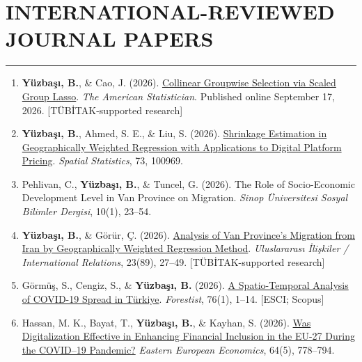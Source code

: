 \documentclass[10pt,letterpaper]{article}
\newcommand{\NewPart}[2]{%
	\Needspace{7\baselineskip}%
	\vspace{0.45em}%
	\section*{\sffamily\large\bfseries\color{MidnightBlue}\uppercase{#1} #2}%
	\vspace{-0.7em}\noindent\color{MidnightBlue}\rule{\textwidth}{0.55pt}\color{Black}\vspace{0.25em}}
\newenvironment{etaremune}{\begin{enumerate}}{\end{enumerate}}
\newcommand{\JournalInfo}[2]{\hspace{0.3em}{\small\textsf{[#1; #2]}}}
\newcommand{\TubitakOutput}{{\small\textsf{[T\"{U}B\.{I}TAK-supported research]}}}
\begin{document}

\NewPart{International-Reviewed Journal Papers}{}


\begin{etaremune}
\renewcommand{\theenumi}{A\arabic{enumi}}

\item {\bf Y\"{u}zba\c{s}{\i}, B.}, \& Cao, J. (2026). \href{https://doi.org/10.1080/00031305.2026.2709494}{Collinear Groupwise Selection via Scaled Group Lasso}. \textit{The American Statistician}. Published online September 17, 2026. \JournalInfo{SCIE}{Q1} \TubitakOutput

\item {\bf Y\"{u}zba\c{s}{\i}, B.}, Ahmed, S. E., \& Liu, S. (2026). \href{https://doi.org/10.1016/j.spasta.2026.100969}{Shrinkage Estimation in Geographically Weighted Regression with Applications to Digital Platform Pricing}. \textit{Spatial Statistics}, 73, 100969. \JournalInfo{SCIE}{Q1}

\item Pehlivan, C., {\bf Y\"{u}zba\c{s}{\i}, B.}, \& Tuncel, G. (2026). The Role of Socio-Economic Development Level in Van Province on Migration. \textit{Sinop \"{U}niversitesi Sosyal Bilimler Dergisi}, 10(1), 23--54.

\item {\bf Y\"{u}zba\c{s}{\i}, B.}, \& G\"{o}r\"{u}r, \c{C}. (2026). \href{https://doi.org/10.33458/uidergisi.1853672}{Analysis of Van Province's Migration from Iran by Geographically Weighted Regression Method}. \textit{Uluslararas{\i} \.{I}li\c{s}kiler / International Relations}, 23(89), 27--49. \JournalInfo{SSCI}{Q3} \TubitakOutput

\item G\"{o}rm\"{u}\c{s}, S., Cengiz, S., \& {\bf Y\"{u}zba\c{s}{\i}, B.} (2026). \href{https://forestist.org/index.php/pub/article/view/2688}{A Spatio-Temporal Analysis of COVID-19 Spread in T\"{u}rkiye}. \textit{Forestist}, 76(1), 1--14. {\small\textsf{[ESCI; Scopus]}}

\item Hassan, M. K., Bayat, T., {\bf Y\"{u}zba\c{s}{\i}, B.}, \& Kayhan, S. (2026). \href{https://doi.org/10.1080/00128775.2025.2546468}{Was Digitalization Effective in Enhancing Financial Inclusion in the EU-27 During the COVID--19 Pandemic?} \textit{Eastern European Economics}, 64(5), 778--794. \JournalInfo{SSCI}{Q3}


\end{etaremune}
\end{document}

